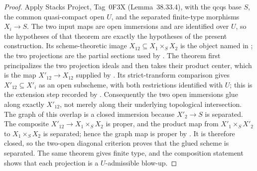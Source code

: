\begin{proof}
  \leanok
  Apply Stacks Project, Tag~0F3X (Lemma~38.33.4), with the qcqs base $S$,
  the common quasi-compact open $U$, and the separated finite-type
  morphisms $X_i\to S$.  The two input maps are open immersions and are
  identified over $U$, so the hypotheses of that theorem are exactly the
  hypotheses of the present construction.  Its scheme-theoretic image
  $X_{12}\subseteq X_1\times_SX_2$ is the object named in
  ; the two projections are the partial
  sections used by
  .  The theorem first
  principalizes the two projection ideals and then takes their product
  center, which is the map $X'_{12}\to X_{12}$ supplied by
  .  Its strict-transform
  comparison gives $X'_{12}\subseteq X'_i$ as an open subscheme, with both
  restrictions identified with $U$; this is the extension step recorded by
  .  Consequently the two open
  immersions glue along exactly $X'_{12}$, not merely along their underlying
  topological intersection.  The graph of this overlap is a closed immersion
  because $X'_2\to S$ is separated.  The composite
  $X'_{12}\to X_1\times_SX_2$ is proper, and the product map from
  $X'_1\times_SX'_2$ to $X_1\times_SX_2$ is separated; hence the graph map
  is proper by
  .  It is therefore closed,
  so the two-open diagonal criterion
   proves that the glued scheme
  is separated.  The same theorem gives finite type, and the composition
  statement
   shows that each projection is a
  $U$-admissible blow-up.
\end{proof}

